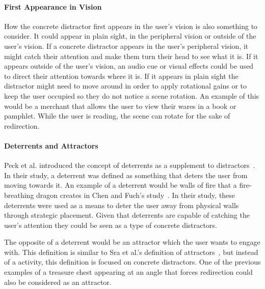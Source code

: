 \paragraph{First Appearance in Vision}
How the concrete distractor first appears in the user's vision is also something to consider. It could appear in plain sight, in the peripheral vision or outside of the user's vision. If a concrete distractor appears in the user's peripheral vision, it might catch their attention and make them turn their head to see what it is. If it appears outside of the user's vision, an audio cue or visual effects could be used to direct their attention towards where it is. If it appears in plain sight the distractor might need to move around in order to apply rotational gains or to keep the user occupied so they do not notice a scene rotation. An example of this would be a merchant that allows the user to view their wares in a book or pamphlet. While the user is reading, the scene can rotate for the sake of redirection. 
         
\paragraph{Deterrents and Attractors}
Peck et al. introduced the concept of deterrents as a supplement to distractors~\cite{peck2011evaluation}. In their study, a deterrent was defined as something that deters the user from moving towards it. An example of a deterrent would be walls of fire that a fire-breathing dragon creates in Chen and Fuch's study~\cite{chen2017supporting}. In their study, these deterrents were used as a means to deter the user away from physical walls through strategic placement. Given that deterrents are capable of catching the user's attention they could be seen as a type of concrete distractors. 

The opposite of a deterrent would be an attractor which the user wants to engage with. This definition is similar to Sra et al.'s definition of attractors~\cite{sra2018vmotion}, but instead of a activity, this definition is focused on concrete distractors. One of the previous examples of a treasure chest appearing at an angle that forces redirection could also be considered as an attractor. 

